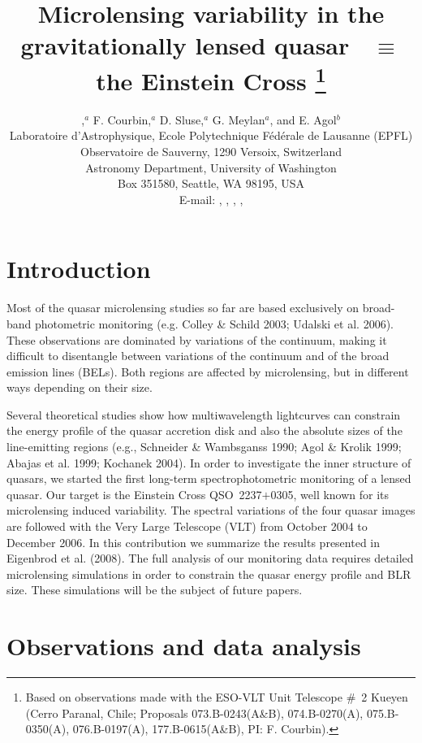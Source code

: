 \documentclass{PoS}
\title{Microlensing variability in the gravitationally lensed quasar     
\vspace*{1mm}  \obj\ $\equiv$ the Einstein Cross
 \thanks{Based on observations made 
 with the ESO-VLT Unit Telescope \#~2 Kueyen 
 (Cerro Paranal, Chile; Proposals 
 073.B-0243(A\&B),
 074.B-0270(A), 
 075.B-0350(A), 
 076.B-0197(A),
 177.B-0615(A\&B), PI: F. Courbin).}
 }
\author{\speaker{A. Eigenbrod},$^a$ F. Courbin,$^a$ D. Sluse,$^a$ G. Meylan$^a$,
and E. Agol$^b$ \\
\llap{$^a$}Laboratoire d'Astrophysique, Ecole Polytechnique F\'ed\'erale
de Lausanne (EPFL)\\ 
Observatoire de Sauverny, 1290 Versoix, Switzerland\\
\llap{$^b$}Astronomy Department, University of Washington\\ 
Box 351580, Seattle, WA 98195, USA\\
E-mail: 
\email{alexander.eigenbrod@epfl.ch},
\email{frederic.courbin@epfl.ch},
\email{dominique.sluse@epfl.ch},
\email{georges.meylan@epfl.ch},
\email{agol@astro.washington.edu}
}
\def\obj{QSO~2237$+$0305}
\begin{document}
\section{Introduction}





Most of the quasar microlensing studies so far are based exclusively on
broad-band photometric monitoring (e.g. Colley \& Schild 2003; Udalski et al.
2006). These observations are dominated by variations of the continuum, 
making it difficult to disentangle between variations of the continuum and
of the broad emission lines (BELs). 
Both regions are affected by microlensing, but
in different ways depending on their size. 




Several theoretical studies show how
multiwavelength lightcurves can constrain the energy profile of the quasar
accretion disk and also the absolute sizes of the line-emitting regions (e.g.,
Schneider \& Wambsganss 1990; Agol \& Krolik 1999; Abajas et al. 1999;  Kochanek 2004). 
In order to investigate the
inner structure of quasars, we started the first long-term spectrophotometric
monitoring of a lensed quasar. Our target is  the Einstein Cross \obj, well known
for its microlensing induced variability. 
The spectral variations  of the  four   quasar images  are followed  
with  the Very Large   Telescope (VLT) 
from October 2004 to December 2006. 
In this contribution we summarize the results presented in
Eigenbrod et al. (2008). 
The full analysis of our monitoring data 
requires detailed  microlensing  simulations 
in order to constrain the quasar energy profile 
and  BLR size. These simulations will be the subject of future papers.









\section{Observations and data analysis}
\end{document}
